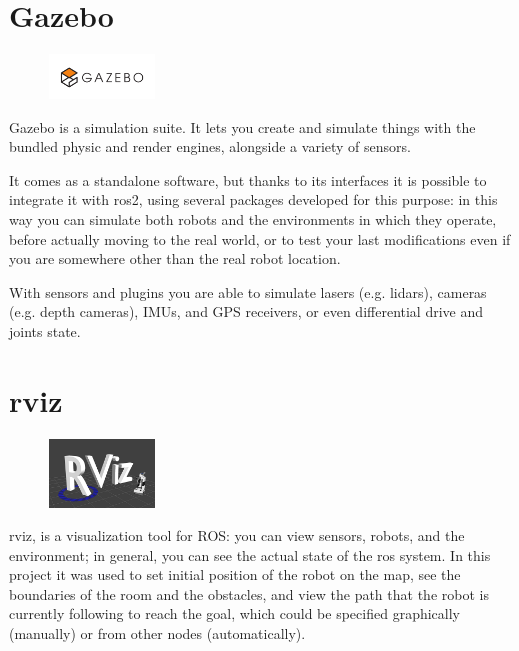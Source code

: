 \section{Gazebo}
\label{sec:gazebo}

\begin{figure}
    \includegraphics[width=0.25\textwidth]{images/gazebo}
\end{figure}

Gazebo is a simulation suite. It lets you create and simulate things with the bundled physic and render engines, alongside a variety of sensors.

It comes as a standalone software, but thanks to its interfaces it is possible to integrate it with \acrshort{ros}2, using several packages developed for this purpose: in this way you can simulate both robots and the environments in which they operate, before actually moving to the real world, or to test your last modifications even if you are somewhere other than the real robot location.

With sensors and plugins you are able to simulate lasers (e.g. lidars), cameras (e.g. depth cameras), IMUs, and GPS receivers, or even differential drive and joints state.

\section{\acrfull{rviz}}

\begin{figure}
    \includegraphics[width=0.25\textwidth]{images/rviz}
\end{figure}

\acrshort{rviz}, is a visualization tool for ROS: you can view sensors, robots, and the environment; in general, you can see the actual state of the \acrshort{ros} system. In this project it was used to set initial position of the robot on the map, see the boundaries of the room and the obstacles, and view the path that the robot is currently following to reach the goal, which could be specified graphically (manually) or from other nodes (automatically). 

